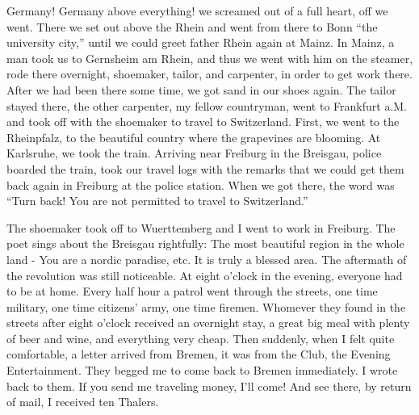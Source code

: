 \documentclass{article}
\begin{document}
Germany! Germany above everything! we screamed out of a full heart, off we went. There we set out above the Rhein and went from there to Bonn ``the university city,'' until we could greet father Rhein again at Mainz. In Mainz, a man took us to Gernsheim am Rhein, and thus we went with him on the steamer, rode there overnight, shoemaker, tailor, and carpenter, in order to get work there. After we had been there some time, we got sand in our shoes again. The tailor stayed there, the other carpenter, my fellow countryman, went to Frankfurt a.M. and took off with the shoemaker to travel to Switzerland. First, we went to the Rheinpfalz, to the beautiful country where the grapevines are blooming. At Karlsruhe, we took the train. Arriving near Freiburg in the Breisgau, police boarded the train, took our travel logs with the remarks that we could get them back again in Freiburg at the police station. When we got there, the word was ``Turn back! You are not permitted to travel to Switzerland.''

The shoemaker took off to Wuerttemberg and I went to work in Freiburg. The poet sings about the Breisgau rightfully: The most beautiful region in the whole land - You are a nordic paradise, etc. It is truly a blessed area. The aftermath of the revolution was still noticeable. At eight o'clock in the evening, everyone had to be at home. Every half hour a patrol went through the streets, one time military, one time citizens' army, one time firemen. Whomever they found in the streets after eight o'clock received an overnight stay, a great big meal with plenty of beer and wine, and everything very cheap. Then suddenly, when I felt quite comfortable, a letter arrived from Bremen, it was from the Club, the Evening Entertainment. They begged me to come back to Bremen immediately. I wrote back to them. If you send me traveling money, I'll come! And see there, by return of mail, I received ten Thalers.
\end{document}
